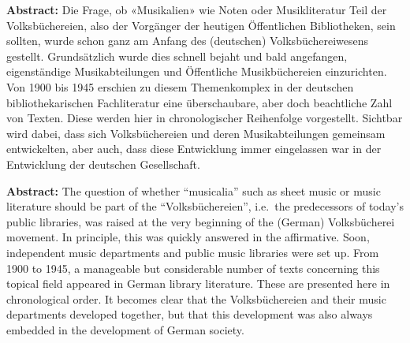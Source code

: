 \textbf{Abstract:} Die Frage, ob «Musikalien» wie Noten oder
Musikliteratur Teil der Volksbüchereien, also der Vorgänger der heutigen
Öffentlichen Bibliotheken, sein sollten, wurde schon ganz am Anfang des
(deutschen) Volksbüchereiwesens gestellt. Grundsätzlich wurde dies
schnell bejaht und bald angefangen, eigenständige Musikabteilungen und
Öffentliche Musikbüchereien einzurichten. Von 1900 bis 1945 erschien zu
diesem Themenkomplex in der deutschen bibliothekarischen Fachliteratur
eine überschaubare, aber doch beachtliche Zahl von Texten. Diese werden
hier in chronologischer Reihenfolge vorgestellt. Sichtbar wird dabei,
dass sich Volksbüchereien und deren Musikabteilungen gemeinsam
entwickelten, aber auch, dass diese Entwicklung immer eingelassen war in
der Entwicklung der deutschen Gesellschaft.

\textbf{Abstract:} The question of whether ``musicalia'' such as sheet
music or music literature should be part of the ``Volksbüchereien'',
i.e.~the predecessors of today's public libraries, was raised at the
very beginning of the (German) Volksbücherei movement. In principle,
this was quickly answered in the affirmative. Soon, independent music
departments and public music libraries were set up. From 1900 to 1945, a
manageable but considerable number of texts concerning this topical
field appeared in German library literature. These are presented here in
chronological order. It becomes clear that the Volksbüchereien and their
music departments developed together, but that this development was also
always embedded in the development of German society.
